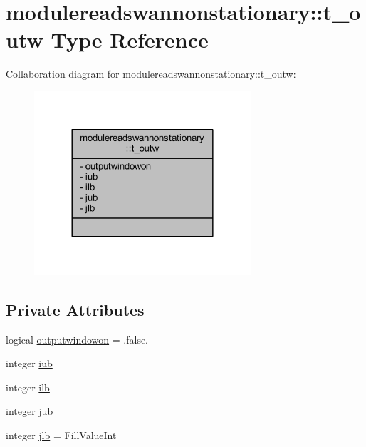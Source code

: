 \hypertarget{structmodulereadswannonstationary_1_1t__outw}{}\section{modulereadswannonstationary\+:\+:t\+\_\+outw Type Reference}
\label{structmodulereadswannonstationary_1_1t__outw}


Collaboration diagram for modulereadswannonstationary\+:\+:t\+\_\+outw\+:\nopagebreak
\begin{figure}[H]
\begin{center}
\leavevmode
\includegraphics[width=228pt]{structmodulereadswannonstationary_1_1t__outw__coll__graph}
\end{center}
\end{figure}
\subsection*{Private Attributes}
\begin{DoxyCompactItemize}
\item 
logical \mbox{\hyperlink{structmodulereadswannonstationary_1_1t__outw_a0397f3849b629e6672d4e722188737e2}{outputwindowon}} = .false.
\item 
integer \mbox{\hyperlink{structmodulereadswannonstationary_1_1t__outw_ad9218fab3e18a4a813097dc5c4faf288}{iub}}
\item 
integer \mbox{\hyperlink{structmodulereadswannonstationary_1_1t__outw_a2c3792c5066814d1908ac4530bc4daa2}{ilb}}
\item 
integer \mbox{\hyperlink{structmodulereadswannonstationary_1_1t__outw_a22869bfe02330c09fe3c6ff1aa8521a1}{jub}}
\item 
integer \mbox{\hyperlink{structmodulereadswannonstationary_1_1t__outw_a636e5b5c6bf2b7430f1b3dbb8e95c016}{jlb}} = Fill\+Value\+Int
\end{DoxyCompactItemize}


